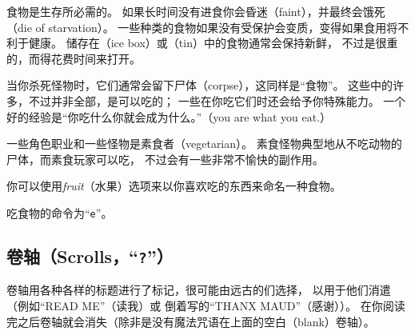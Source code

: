 \documentclass[a4paper, 10pt]{article}
\begin{document}
食物是生存所必需的。
如果长时间没有进食你会昏迷（faint），并最终会饿死（die of starvation）。
一些种类的食物如果没有受保护会变质，变得如果食用将不利于健康。
储存在\zhTransIceBox（ice box）或\zhTransTin（tin）中的食物通常会保持新鲜，
不过\zhTransIceBox{}是很重的，而\zhTransTin{}得花费时间来打开。

当你杀死怪物时，它们通常会留下尸体（corpse），这同样是“食物”。
这些中的许多，不过并非全部，是可以吃的；
一些在你吃它们时还会给予你特殊能力。
一个好的经验是“你吃什么你就会成为什么。”（you are what you eat.）

一些角色职业和一些怪物是素食者（vegetarian）。
素食怪物典型地从不吃动物的尸体，而素食玩家可以吃，
不过会有一些非常不愉快的副作用。

你可以使用{\it fruit\/}（水果）选项来以你喜欢吃的东西来命名一种食物。

吃食物的命令为“{\tt e}”。

\subsection*{卷轴（Scrolls，“{\tt ?}”）}

卷轴用各种各样的标题进行了标记，很可能由远古的\zhTransWizards{}们选择，
以用于他们消遣（例如“READ ME”（读我）或
倒着写的“THANX MAUD”（感谢\zhTransMAUD））。
在你阅读完之后卷轴就会消失（除非是没有魔法咒语在上面的空白（blank）卷轴）。
\end{document}
